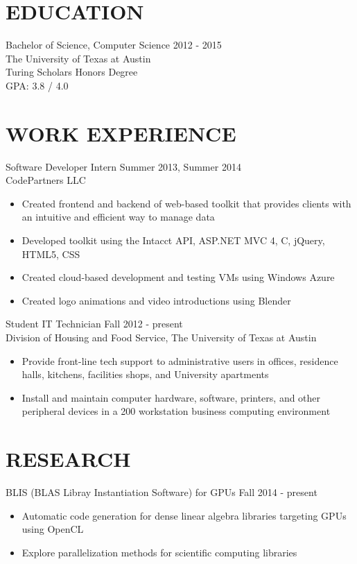 \documentclass[margin]{res}
\newcommand{\PLUS}{\nolinebreak\hspace{-.05em}\raisebox{.4ex}{\tiny\bf+}}
\newcommand{\CS}{C\nolinebreak\hspace{-.05em}\raisebox{.4ex}{\scriptsize\bf \#}}
\begin{document}
\begin{resume}
 
\section{EDUCATION}
	Bachelor of Science, Computer Science \hfill 2012 - 2015\\
	The University of Texas at Austin\\
	Turing Scholars Honors Degree\\
	GPA: 3.8 / 4.0

\section{WORK EXPERIENCE}
	Software Developer Intern \hfill Summer 2013, Summer 2014 \\
	CodePartners LLC
	\begin{itemize} \itemsep -1pt %
	\item Created frontend and backend of web-based toolkit that provides clients with an intuitive and efficient way to manage data
	\item Developed toolkit using the Intacct API, ASP.NET MVC 4, \CS{}, jQuery, HTML5, CSS
	\item Created cloud-based development and testing VMs using Windows Azure
	\item Created logo animations and video introductions using Blender
	\end{itemize}
 
	Student IT Technician \hfill Fall 2012 - present \\
	Division of Housing and Food Service, The University of Texas at Austin
	\begin{itemize} \itemsep -2pt %
	\item Provide front-line tech support to administrative users in offices, residence halls, kitchens, facilities shops, and University apartments
	\item Install and maintain computer hardware, software, printers, and other peripheral devices in a 200\PLUS{} workstation business computing environment
	\end{itemize}

\section{RESEARCH}
	BLIS (BLAS Libray Instantiation Software) for GPUs \hfill Fall 2014 - present
	\begin{itemize} \itemsep -2pt
	\item Automatic code generation for dense linear algebra libraries targeting GPUs using OpenCL
	\item Explore parallelization methods for scientific computing libraries
	\end{itemize}


\end{resume}
\end{document}
